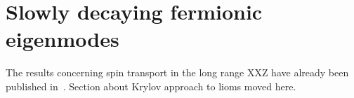 \chapter{Slowly decaying fermionic eigenmodes\label{chap:currents}}
\thispagestyle{chapterBeginStyle}

The results concerning spin transport in the long range XXZ have already been published in~\textcite{Mierzejewski2023}.
Section about Krylov approach to lioms moved here.